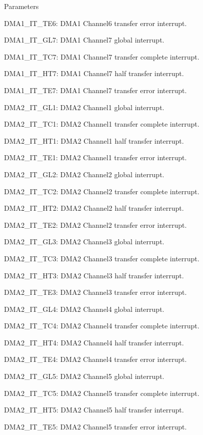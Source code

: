 \begin{DoxyParams}{Parameters}
\begin{DoxyItemize}
D\+M\+A1\+\_\+\+I\+T\+\_\+\+T\+E6\+: D\+M\+A1 Channel6 transfer error interrupt. \item D\+M\+A1\+\_\+\+I\+T\+\_\+\+G\+L7\+: D\+M\+A1 Channel7 global interrupt. \item D\+M\+A1\+\_\+\+I\+T\+\_\+\+T\+C7\+: D\+M\+A1 Channel7 transfer complete interrupt. \item D\+M\+A1\+\_\+\+I\+T\+\_\+\+H\+T7\+: D\+M\+A1 Channel7 half transfer interrupt. \item D\+M\+A1\+\_\+\+I\+T\+\_\+\+T\+E7\+: D\+M\+A1 Channel7 transfer error interrupt. \item D\+M\+A2\+\_\+\+I\+T\+\_\+\+G\+L1\+: D\+M\+A2 Channel1 global interrupt. \item D\+M\+A2\+\_\+\+I\+T\+\_\+\+T\+C1\+: D\+M\+A2 Channel1 transfer complete interrupt. \item D\+M\+A2\+\_\+\+I\+T\+\_\+\+H\+T1\+: D\+M\+A2 Channel1 half transfer interrupt. \item D\+M\+A2\+\_\+\+I\+T\+\_\+\+T\+E1\+: D\+M\+A2 Channel1 transfer error interrupt. \item D\+M\+A2\+\_\+\+I\+T\+\_\+\+G\+L2\+: D\+M\+A2 Channel2 global interrupt. \item D\+M\+A2\+\_\+\+I\+T\+\_\+\+T\+C2\+: D\+M\+A2 Channel2 transfer complete interrupt. \item D\+M\+A2\+\_\+\+I\+T\+\_\+\+H\+T2\+: D\+M\+A2 Channel2 half transfer interrupt. \item D\+M\+A2\+\_\+\+I\+T\+\_\+\+T\+E2\+: D\+M\+A2 Channel2 transfer error interrupt. \item D\+M\+A2\+\_\+\+I\+T\+\_\+\+G\+L3\+: D\+M\+A2 Channel3 global interrupt. \item D\+M\+A2\+\_\+\+I\+T\+\_\+\+T\+C3\+: D\+M\+A2 Channel3 transfer complete interrupt. \item D\+M\+A2\+\_\+\+I\+T\+\_\+\+H\+T3\+: D\+M\+A2 Channel3 half transfer interrupt. \item D\+M\+A2\+\_\+\+I\+T\+\_\+\+T\+E3\+: D\+M\+A2 Channel3 transfer error interrupt. \item D\+M\+A2\+\_\+\+I\+T\+\_\+\+G\+L4\+: D\+M\+A2 Channel4 global interrupt. \item D\+M\+A2\+\_\+\+I\+T\+\_\+\+T\+C4\+: D\+M\+A2 Channel4 transfer complete interrupt. \item D\+M\+A2\+\_\+\+I\+T\+\_\+\+H\+T4\+: D\+M\+A2 Channel4 half transfer interrupt. \item D\+M\+A2\+\_\+\+I\+T\+\_\+\+T\+E4\+: D\+M\+A2 Channel4 transfer error interrupt. \item D\+M\+A2\+\_\+\+I\+T\+\_\+\+G\+L5\+: D\+M\+A2 Channel5 global interrupt. \item D\+M\+A2\+\_\+\+I\+T\+\_\+\+T\+C5\+: D\+M\+A2 Channel5 transfer complete interrupt. \item D\+M\+A2\+\_\+\+I\+T\+\_\+\+H\+T5\+: D\+M\+A2 Channel5 half transfer interrupt. \item D\+M\+A2\+\_\+\+I\+T\+\_\+\+T\+E5\+: D\+M\+A2 Channel5 transfer error interrupt. \end{DoxyItemize}
\\
\hline
\end{DoxyParams}

